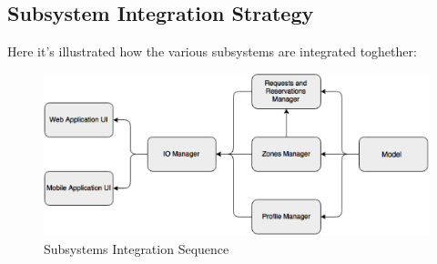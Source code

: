 \documentclass[../../../../../../testPlan.tex]{subfiles}
\begin{document}
	\subsection{Subsystem Integration Strategy}
		Here it's illustrated how the various subsystems are integrated toghether:
		\begin{figure}[H]
			\centering
			\includegraphics[width=\textwidth, scale=0.5]{../images/priority_subsystems.png}
			\caption{Subsystems Integration Sequence}\label{fig:SubsystemsSequence}
		\end{figure}
	
	 
\end{document}
